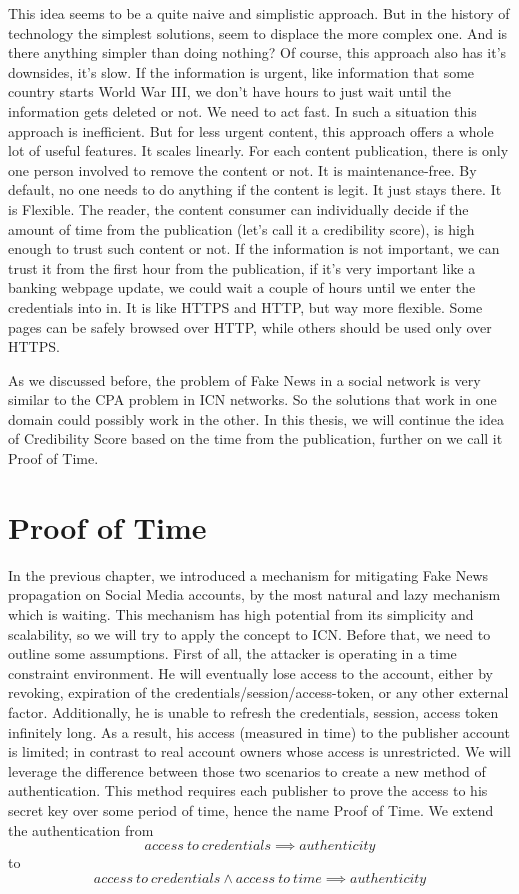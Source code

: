 \documentclass[nostrict]{szablonPG}
\begin{document}
This idea seems to be a quite naive and simplistic approach. But in the history of technology the simplest solutions, seem to displace the more complex one. And is there anything simpler than doing nothing? 
Of course, this approach also has it's downsides, it's slow. If the information is urgent, like information that some country starts World War III, we don't have hours to just wait until the information gets deleted or not. We need to act fast. In such a situation this approach is inefficient. But for less urgent content, this approach offers a whole lot of useful features. It scales linearly. For each content publication, there is only one person involved to remove the content or not. It is maintenance-free. By default, no one needs to do anything if the content is legit. It just stays there. It is Flexible. The reader, the content consumer can individually decide if the amount of time from the publication (let's call it a credibility score), is high enough to trust such content or not. If the information is not important, we can trust it from the first hour from the publication, if it's very important like a banking webpage update, we could wait a couple of hours until we enter the credentials into in. It is like HTTPS and HTTP, but way more flexible. Some pages can be safely browsed over HTTP, while others should be used only over HTTPS. 

As we discussed before, the problem of Fake News in a social network is very similar to the CPA problem in ICN networks. So the solutions that work in one domain could possibly work in the other. In this thesis, we will continue the idea of Credibility Score based on the time from the publication, further on we call it Proof of Time.

\section{Proof of Time}
\label{proof-of-time}
In the previous chapter, we introduced a mechanism for mitigating Fake News propagation on Social Media accounts, by the most natural and lazy mechanism which is waiting. This mechanism has high potential from its simplicity and scalability, so we will try to apply the concept to ICN. Before that, we need to outline some assumptions. First of all, the attacker is operating in a time constraint environment. He will eventually lose access to the account, either by revoking, expiration of the credentials/session/access-token, or any other external factor. Additionally, he is unable to refresh the credentials, session, access token infinitely long. As a result, his access (measured in time) to the publisher account is limited; in contrast to real account owners whose access is unrestricted.
We will leverage the difference between those two scenarios to create a new method of authentication. This method requires each publisher to prove the access to his secret key over some period of time, hence the name Proof of Time. 
We extend the authentication from 
\[access\ to\ credentials \implies authenticity\]
to 
\[access\ to\ credentials \land access\ to\ time \implies authenticity\]
\end{document}
